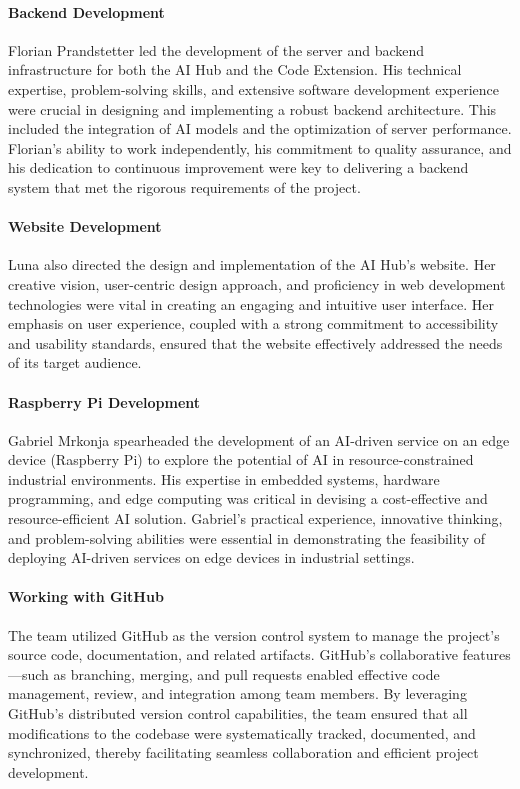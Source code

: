 \paragraph{Backend Development}  
Florian Prandstetter led the development of the server and backend infrastructure for both the AI Hub and the Code Extension. His technical expertise, problem-solving skills, and extensive software development experience were crucial in designing and implementing a robust backend architecture. This included the integration of AI models and the optimization of server performance. Florian’s ability to work independently, his commitment to quality assurance, and his dedication to continuous improvement were key to delivering a backend system that met the rigorous requirements of the project.

\paragraph{Website Development}  
Luna also directed the design and implementation of the AI Hub’s website. Her creative vision, user-centric design approach, and proficiency in web development technologies were vital in creating an engaging and intuitive user interface. Her emphasis on user experience, coupled with a strong commitment to accessibility and usability standards, ensured that the website effectively addressed the needs of its target audience.

\paragraph{Raspberry Pi Development}  
Gabriel Mrkonja spearheaded the development of an AI-driven service on an edge device (Raspberry Pi) to explore the potential of AI in resource-constrained industrial environments. His expertise in embedded systems, hardware programming, and edge computing was critical in devising a cost-effective and resource-efficient AI solution. Gabriel’s practical experience, innovative thinking, and problem-solving abilities were essential in demonstrating the feasibility of deploying AI-driven services on edge devices in industrial settings.

\paragraph{Working with GitHub}  
The team utilized GitHub as the version control system to manage the project’s source code, documentation, and related artifacts. GitHub’s collaborative features—such as branching, merging, and pull requests enabled effective code management, review, and integration among team members. By leveraging GitHub’s distributed version control capabilities, the team ensured that all modifications to the codebase were systematically tracked, documented, and synchronized, thereby facilitating seamless collaboration and efficient project development.


